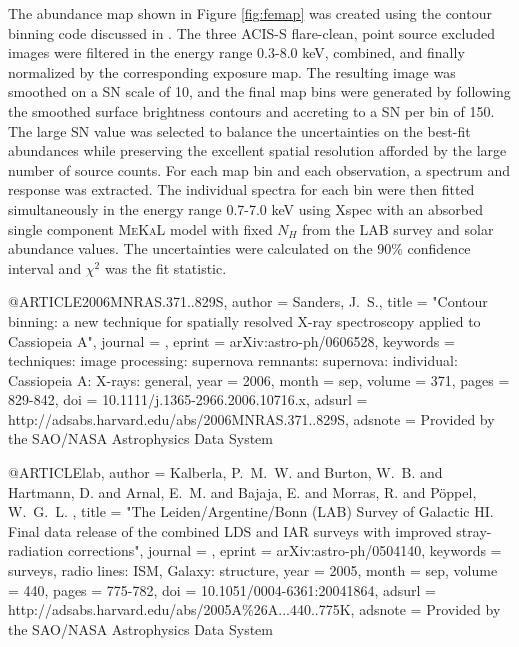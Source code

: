 The abundance map shown in Figure \ref{fig:femap} was created using
the contour binning code discussed in \citet{2006MNRAS.371..829S}. The
three ACIS-S flare-clean, point source excluded images were filtered
in the energy range 0.3-8.0 keV, combined, and finally normalized by
the corresponding exposure map. The resulting image was smoothed on a
SN scale of 10, and the final map bins were generated by following the
smoothed surface brightness contours and accreting to a SN per bin of
150. The large SN value was selected to balance the uncertainties on
the best-fit abundances while preserving the excellent spatial
resolution afforded by the large number of source counts. For each map
bin and each observation, a spectrum and response was extracted. The
individual spectra for each bin were then fitted simultaneously in the
energy range 0.7-7.0 keV using Xspec \citep{xspec} with an absorbed
single component {\textsc{MeKaL}} model \citep{mekal1, mekal2, mekal3}
with fixed $N_H$ from the LAB survey \citep{lab} and \citet{ag89}
solar abundance values. The uncertainties were calculated on the 90\%
confidence interval and $\chi^2$ was the fit statistic.

@ARTICLE{2006MNRAS.371..829S,
   author = {{Sanders}, J.~S.},
    title = "{Contour binning: a new technique for spatially resolved X-ray spectroscopy applied to Cassiopeia A}",
  journal = {\mnras},
   eprint = {arXiv:astro-ph/0606528},
 keywords = {techniques: image processing: supernova remnants: supernova: individual: Cassiopeia A: X-rays: general},
     year = 2006,
    month = sep,
   volume = 371,
    pages = {829-842},
      doi = {10.1111/j.1365-2966.2006.10716.x},
   adsurl = {http://adsabs.harvard.edu/abs/2006MNRAS.371..829S},
  adsnote = {Provided by the SAO/NASA Astrophysics Data System}
}

@ARTICLE{lab,
   author = {{Kalberla}, P.~M.~W. and {Burton}, W.~B. and {Hartmann}, D. and 
   {Arnal}, E.~M. and {Bajaja}, E. and {Morras}, R. and {P{\"o}ppel}, W.~G.~L.
   },
    title = "{The Leiden/Argentine/Bonn (LAB) Survey of Galactic HI. Final data release of the combined LDS and IAR surveys with improved stray-radiation corrections}",
  journal = {\aap},
   eprint = {arXiv:astro-ph/0504140},
 keywords = {surveys, radio lines: ISM, Galaxy: structure},
     year = 2005,
    month = sep,
   volume = 440,
    pages = {775-782},
      doi = {10.1051/0004-6361:20041864},
   adsurl = {http://adsabs.harvard.edu/abs/2005A\%26A...440..775K},
  adsnote = {Provided by the SAO/NASA Astrophysics Data System}
}

